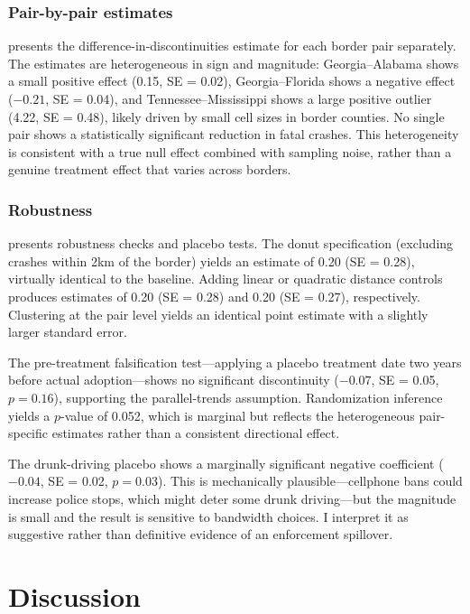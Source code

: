 \documentclass[12pt]{article}
\begin{document}
\subsubsection*{Pair-by-pair estimates}  presents the difference-in-discontinuities estimate for each border pair separately. The estimates are heterogeneous in sign and magnitude: Georgia--Alabama shows a small positive effect (0.15, SE = 0.02), Georgia--Florida shows a negative effect ($-0.21$, SE = 0.04), and Tennessee--Mississippi shows a large positive outlier (4.22, SE = 0.48), likely driven by small cell sizes in border counties. No single pair shows a statistically significant reduction in fatal crashes. This heterogeneity is consistent with a true null effect combined with sampling noise, rather than a genuine treatment effect that varies across borders.



\subsubsection*{Robustness}  presents robustness checks and placebo tests. The donut specification (excluding crashes within 2km of the border) yields an estimate of 0.20 (SE = 0.28), virtually identical to the baseline. Adding linear or quadratic distance controls produces estimates of 0.20 (SE = 0.28) and 0.20 (SE = 0.27), respectively. Clustering at the pair level yields an identical point estimate with a slightly larger standard error.

The pre-treatment falsification test---applying a placebo treatment date two years before actual adoption---shows no significant discontinuity ($-0.07$, SE = 0.05, $p = 0.16$), supporting the parallel-trends assumption. Randomization inference yields a $p$-value of 0.052, which is marginal but reflects the heterogeneous pair-specific estimates rather than a consistent directional effect.

The drunk-driving placebo shows a marginally significant negative coefficient ($-0.04$, SE = 0.02, $p = 0.03$). This is mechanically plausible---cellphone bans could increase police stops, which might deter some drunk driving---but the magnitude is small and the result is sensitive to bandwidth choices. I interpret it as suggestive rather than definitive evidence of an enforcement spillover.




\section{Discussion}
\end{document}
